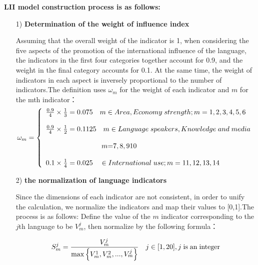 \par \textbf{LII model construction process is as follows:}

\begin{enumerate}
	\item[1)] \textbf{Determination of the weight of influence index}
	\par Assuming that the overall weight of the indicator is 1, when considering the five aspects of the promotion of the international influence of the language, the indicators in the first four categories together account for 0.9, and the weight in the final category accounts for 0.1. At the same time, the weight of indicators in each aspect is inversely proportional to the number of indicators.The definition uses ${\omega _m}$ for the weight of each indicator and $m$ for the mth indicator：
	\begin{equation}
	{\omega _m} = \left\{ \begin{array}{l}
	\frac{{0.9}}{4} \times \frac{1}{3} = 0.075{\rm{          }} \quad m \in Area,Economy\;{\rm{ }}strength;m = 1,2,3,4,5,6{\rm{   }}\\
	\\
	\frac{{0.9}}{4} \times \frac{1}{2} = 0.1125{\rm{        }}\quad m \in Language\;{\rm{ }}speakers,Knowledge\;{\rm{ }}and\;{\rm{ }}media\\
	\\
	{\rm{                                  }} \quad \quad \quad \quad \quad \quad \quad \quad  m{\rm{ = }}7,8,910\\
	\\
	0.1 \times \frac{1}{4} = 0.025{\rm{           }}\quad \in International\;{\rm{ }}use;m = 11,12,13,14
	\end{array} \right. \label{aa1}
	\end{equation}
	
	\item[2)] \textbf{the normalization of language indicators}
	\par Since the dimensions of each indicator are not consistent, in order to unify the calculation, we normalize the indicators and map their values to [0,1].The process is as follows: Define the value of the $m$ indicator corresponding to the $j$th language to be $V_m^j$, then normalize by the following formula：
	
	\begin{equation}
	S_m^j = \frac{{V_m^j}}{{\max \left\{ {V_m^1,V_m^2,...,V_m^j} \right\}}}{\rm{        }}\quad j \in [1,20],j\;{\rm{ is\; an\; integer}}\label{aa1}
	\end{equation}
	

\end{enumerate}
